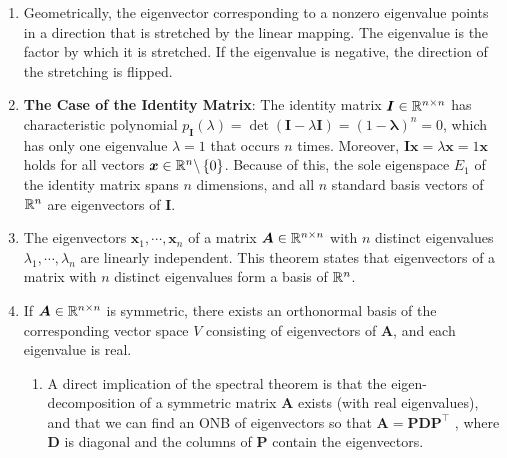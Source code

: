 \begin{enumerate}
    \item Geometrically, the eigenvector corresponding to a nonzero eigenvalue points in a direction that is stretched by the linear mapping.
    The eigenvalue is the factor by which it is stretched.
    If the eigenvalue is negative, the direction of the stretching is flipped.
    \hfill \cite{mfml/book/mml/Deisenroth-Faisal-Ong}

    \item \textbf{The Case of the Identity Matrix}: The identity matrix $\bm{I} \in \mathbb{R}^{n\times n}$ has characteristic polynomial $p_{\bm{I}} (\lambda ) = \det(\bm{I} -\lambda \bm{I}) = (1-\bm{\lambda }) ^n = 0$, which has only one eigenvalue $\lambda  = 1$ that occurs $n$ times.
    Moreover, $\bm{Ix} = \lambda \bm{x} = 1\bm{x}$ holds for all vectors $\bm{x} \in \mathbb{R}^n\backslash \left\{0\right\}$.
    Because of this, the sole eigenspace $E_1$ of the identity matrix spans $n$ dimensions, and all $n$ standard basis vectors of $\mathbb{R}^n$ are eigenvectors of $\bm{I}$.
    \hfill \cite{mfml/book/mml/Deisenroth-Faisal-Ong}

    \item
    \begin{theorem}
        The eigenvectors $\bm{x}_1, \cdots , \bm{x}_n$ of a matrix $\bm{A} \in \mathbb{R}^{n\times n}$ with $n$ distinct eigenvalues $\lambda _1, \cdots , \lambda _n$ are linearly independent.
        This theorem states that eigenvectors of a matrix with $n$ distinct eigenvalues form a basis of $\mathbb{R}^n$.
        \hfill \cite{mfml/book/mml/Deisenroth-Faisal-Ong}
    \end{theorem}

    \item
    \begin{theorem}
        If $\bm{A} \in \mathbb{R}^{n\times n}$ is symmetric, there exists an orthonormal basis of the corresponding vector space $V$ consisting of eigenvectors of $\bm{A}$, and each eigenvalue is real.
        \hfill \cite{mfml/book/mml/Deisenroth-Faisal-Ong}
    \end{theorem}
    \begin{enumerate}
        \item A direct implication of the spectral theorem is that the eigen-decomposition of a symmetric matrix $\bm{A}$ exists (with real eigenvalues), and that we can find an ONB of eigenvectors so that $\bm{A} = \bm{PDP}^\top$ , where $\bm{D}$ is diagonal and the columns of $\bm{P}$ contain the eigenvectors.
        \hfill \cite{mfml/book/mml/Deisenroth-Faisal-Ong}
    \end{enumerate}
\end{enumerate}




